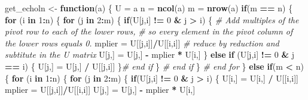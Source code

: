 \documentclass[]{article}
\newenvironment{Shaded}{\begin{snugshade}}{\end{snugshade}}
\newcommand{\CommentTok}[1]{\textcolor[rgb]{0.56,0.35,0.01}{\textit{#1}}}
\newcommand{\ControlFlowTok}[1]{\textcolor[rgb]{0.13,0.29,0.53}{\textbf{#1}}}
\newcommand{\DecValTok}[1]{\textcolor[rgb]{0.00,0.00,0.81}{#1}}
\newcommand{\KeywordTok}[1]{\textcolor[rgb]{0.13,0.29,0.53}{\textbf{#1}}}
\newcommand{\NormalTok}[1]{#1}
\newcommand{\OperatorTok}[1]{\textcolor[rgb]{0.81,0.36,0.00}{\textbf{#1}}}
\newcommand{\StringTok}[1]{\textcolor[rgb]{0.31,0.60,0.02}{#1}}
\begin{document}
\begin{Shaded}
\begin{Highlighting}[]
\NormalTok{get_echoln <-}\StringTok{ }\ControlFlowTok{function}\NormalTok{(a) \{}
\NormalTok{  U =}\StringTok{ }\NormalTok{a}
\NormalTok{  n =}\StringTok{ }\KeywordTok{ncol}\NormalTok{(a)}
\NormalTok{  m =}\StringTok{ }\KeywordTok{nrow}\NormalTok{(a)}
  \ControlFlowTok{if}\NormalTok{(m }\OperatorTok{==}\StringTok{ }\NormalTok{n) \{}
    \ControlFlowTok{for}\NormalTok{ (i }\ControlFlowTok{in} \DecValTok{1}\OperatorTok{:}\NormalTok{n) \{}
      \ControlFlowTok{for}\NormalTok{ (j }\ControlFlowTok{in} \DecValTok{2}\OperatorTok{:}\NormalTok{m) \{}
        \ControlFlowTok{if}\NormalTok{(U[j,i] }\OperatorTok{!=}\StringTok{ }\DecValTok{0} \OperatorTok{&}\StringTok{ }\NormalTok{j }\OperatorTok{>}\StringTok{ }\NormalTok{i) \{}
          \CommentTok{# Add multiples of the pivot row to each of the lower rows, }
          \CommentTok{# so every element in the pivot column of the lower rows equals 0.}
\NormalTok{          mplier =}\StringTok{ }\NormalTok{U[[j,i]]}\OperatorTok{/}\NormalTok{U[[i,i]]}
          \CommentTok{# reduce by reduction and subtitute in the U matrix}
\NormalTok{          U[j,] =}\StringTok{ }\NormalTok{U[j,] }\OperatorTok{-}\StringTok{ }\NormalTok{mplier }\OperatorTok{*}\StringTok{ }\NormalTok{U[i,]}
\NormalTok{        \} }\ControlFlowTok{else} \ControlFlowTok{if}\NormalTok{ (U[j,i] }\OperatorTok{!=}\StringTok{ }\DecValTok{0} \OperatorTok{&}\StringTok{ }\NormalTok{j }\OperatorTok{==}\StringTok{ }\NormalTok{i) \{}
\NormalTok{          U[j,] =}\StringTok{ }\NormalTok{U[j,] }\OperatorTok{/}\StringTok{ }\NormalTok{U[[j,i]]}
\NormalTok{        \}}\CommentTok{# end if}
\NormalTok{      \} }\CommentTok{# end if }
\NormalTok{    \} }\CommentTok{# end for}
\NormalTok{  \} }\ControlFlowTok{else} \ControlFlowTok{if}\NormalTok{(m }\OperatorTok{<}\StringTok{ }\NormalTok{n) \{}
    \ControlFlowTok{for}\NormalTok{ (i }\ControlFlowTok{in} \DecValTok{1}\OperatorTok{:}\NormalTok{n) \{}
      \ControlFlowTok{for}\NormalTok{ (j }\ControlFlowTok{in} \DecValTok{2}\OperatorTok{:}\NormalTok{m) \{}
        \ControlFlowTok{if}\NormalTok{(U[j,i] }\OperatorTok{!=}\StringTok{ }\DecValTok{0} \OperatorTok{&}\StringTok{ }\NormalTok{j }\OperatorTok{>}\StringTok{ }\NormalTok{i) \{}
\NormalTok{          U[i,] =}\StringTok{ }\NormalTok{U[i,] }\OperatorTok{/}\StringTok{ }\NormalTok{U[[i,i]]}
\NormalTok{          mplier =}\StringTok{ }\NormalTok{U[[j,i]]}\OperatorTok{/}\NormalTok{U[[i,i]]}
\NormalTok{          U[j,] =}\StringTok{ }\NormalTok{U[j,] }\OperatorTok{-}\StringTok{ }\NormalTok{mplier }\OperatorTok{*}\StringTok{ }\NormalTok{U[i,]}
          

\end{Highlighting}
\end{Shaded}
\end{document}
